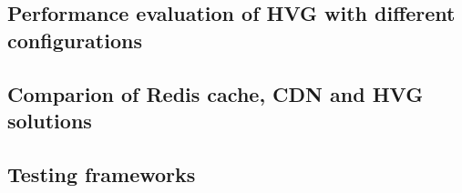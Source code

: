 \subsection{Performance evaluation of HVG with different configurations}


\subsection{Comparion of Redis cache, CDN and HVG solutions}


\subsection{Testing frameworks}





\newpage




